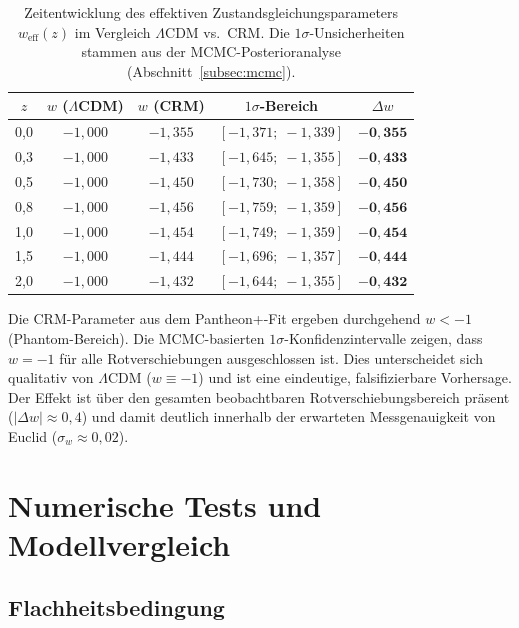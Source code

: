 \documentclass[aps,prd,twocolumn,superscriptaddress,nofootinbib]{revtex4-2}
\begin{document}
\begin{table}[H]
\centering
\caption{Zeitentwicklung des effektiven Zustandsgleichungsparameters $w_{\mathrm{eff}}(z)$ im Vergleich $\Lambda$CDM vs.\ CRM. Die $1\sigma$-Unsicherheiten stammen aus der MCMC-Posterioranalyse (Abschnitt~\ref{subsec:mcmc}).}
\label{tab:weff}
\begin{tabular}{ccccc}
\toprule
$z$ & $w$ ($\Lambda$CDM) & $w$ (CRM) & $1\sigma$-Bereich & $\Delta w$ \\
\midrule
0,0 & $-1{,}000$ & $-1{,}355$ & $[-1{,}371;\;-1{,}339]$ & $\mathbf{-0{,}355}$ \\
0,3 & $-1{,}000$ & $-1{,}433$ & $[-1{,}645;\;-1{,}355]$ & $\mathbf{-0{,}433}$ \\
0,5 & $-1{,}000$ & $-1{,}450$ & $[-1{,}730;\;-1{,}358]$ & $\mathbf{-0{,}450}$ \\
0,8 & $-1{,}000$ & $-1{,}456$ & $[-1{,}759;\;-1{,}359]$ & $\mathbf{-0{,}456}$ \\
1,0 & $-1{,}000$ & $-1{,}454$ & $[-1{,}749;\;-1{,}359]$ & $\mathbf{-0{,}454}$ \\
1,5 & $-1{,}000$ & $-1{,}444$ & $[-1{,}696;\;-1{,}357]$ & $\mathbf{-0{,}444}$ \\
2,0 & $-1{,}000$ & $-1{,}432$ & $[-1{,}644;\;-1{,}355]$ & $\mathbf{-0{,}432}$ \\
\bottomrule
\end{tabular}
\end{table}

Die CRM-Parameter aus dem Pantheon+-Fit ergeben durchgehend $w < -1$ (Phantom-Bereich). Die MCMC-basierten $1\sigma$-Konfidenzintervalle zeigen, dass $w = -1$ f\"ur alle Rotverschiebungen ausgeschlossen ist. Dies unterscheidet sich qualitativ von $\Lambda$CDM ($w \equiv -1$) und ist eine eindeutige, falsifizierbare Vorhersage. Der Effekt ist \"uber den gesamten beobachtbaren Rotverschiebungsbereich pr\"asent ($|\Delta w| \approx 0{,}4$) und damit deutlich innerhalb der erwarteten Messgenauigkeit von Euclid ($\sigma_w \approx 0{,}02$).

\section{Numerische Tests und Modellvergleich}
\label{sec:numerik}

\subsection{Flachheitsbedingung}
\label{subsec:flachheit}
\end{document}
